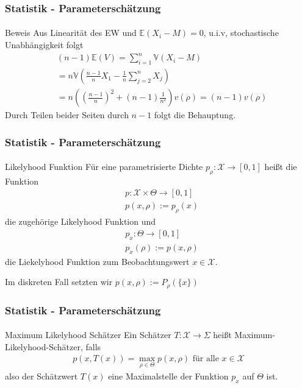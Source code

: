\documentclass{beamer}
\begin{document}
\begin{frame}
    \frametitle{Statistik - Parameterschätzung}
\framesubtitle{}

\begin{block}{Beweis}
Aus Linearität des EW und $\mathbb{E}(X_i - M) = 0$, u.i.v, stochastische Unabhängigkeit folgt
\begin{align*}
&(n-1) \mathbb{E}(V)  = \sum_{i=1}^n  \mathbb{V}(X_i - M) \\
& = n   \mathbb{V} (\frac{n-1}{n} X_1  - \frac{1}{n} \sum_{j=2}^n X_j) \\
& = n((\frac{n-1}{n})^2 + (n-1) \frac{1}{n^2}  ) v(\rho) = (n-1) v(\rho)
\end{align*}
Durch Teilen beider Seiten durch $n-1$ folgt die Behauptung. 
\end{block}


 \end{frame}




\begin{frame}
    \frametitle{Statistik - Parameterschätzung}
\framesubtitle{}

\begin{block}{Likelyhood Funktion}
Für eine parametrisierte Dichte $p_\rho : \mathcal{X}   \to  [0,1]$ heißt die Funktion
\begin{align*}
& p  : \mathcal{X}  \times  \Theta  \to  [0,1] \\
& p(x, \rho) := p_\rho (x)
\end{align*}
die zugehörige Likelyhood Funktion und 
\begin{align*}
& p_x  : \Theta   \to  [0,1] \\
& p_x(\rho):=  p(x, \rho) 
\end{align*}
die Liekelyhood Funktion zum Beobachtungswert $x \in \mathcal{X}$.

Im diskreten Fall setzten wir $ p(x, \rho) := P_\rho (\{ x\})$
\end{block}
 \end{frame}



\begin{frame}
    \frametitle{Statistik - Parameterschätzung}
\framesubtitle{}
\begin{block}{Maximum Likelyhood Schätzer}
Ein Schätzer $T: \mathcal{X} \to \Sigma$ heißt Maximum-Likelyhood-Schätzer, falls
\begin{align*}
p(x , T(x)) = \max_{\rho \in \Theta} p (x, \rho) \text{ für alle } x \in \mathcal{X}
\end{align*}
also der Schätzwert $T(x)$ eine Maximalstelle der Funktion  $p_x$ auf $\Theta$ ist.
\end{block}

 \end{frame}
\end{document}
